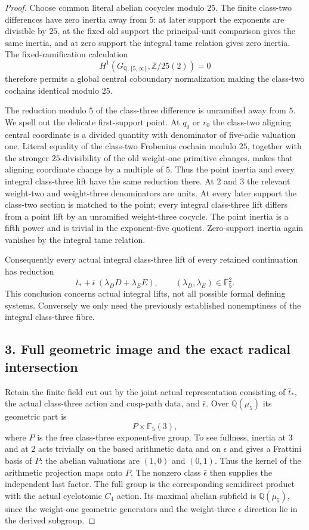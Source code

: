 \documentclass[11pt]{article}
\newcommand{\Z}{\mathbb Z}\newcommand{\F}{\mathbb F}\newcommand{\Q}{\mathbb Q}
\begin{document}
\begin{proof}
Choose common literal abelian cocycles modulo $25$. The finite class-two differences have zero inertia away from $5$: at later support the exponents are divisible by $25$, at the fixed old support the principal-unit comparison gives the same inertia, and at zero support the integral tame relation gives zero inertia. The fixed-ramification calculation
\[
 H^1(G_{\Q,\{5,\infty\}},\Z/25(2))=0
\]
therefore permits a global central coboundary normalization making the class-two cochains identical modulo $25$.

The reduction modulo $5$ of the class-three difference is unramified away from $5$. We spell out the delicate first-support point. At $q_0$ or $r_0$ the class-two aligning central coordinate is a divided quantity with denominator of five-adic valuation one. Literal equality of the class-two Frobenius cochain modulo $25$, together with the stronger $25$-divisibility of the old weight-one primitive changes, makes that aligning coordinate change by a multiple of $5$. Thus the point inertia and every integral class-three lift have the same reduction there. At $2$ and $3$ the relevant weight-two and weight-three denominators are units. At every later support the class-two section is matched to the point; every integral class-three lift differs from a point lift by an unramified weight-three cocycle. The point inertia is a fifth power and is trivial in the exponent-five quotient. Zero-support inertia again vanishes by the integral tame relation.

Consequently every actual integral class-three lift of every retained continuation has reduction
\[
 \bar t_*+\bar\epsilon\,(\lambda_DD+\lambda_EE),
 \qquad (\lambda_D,\lambda_E)\in\F_5^2.
 \tag{2}
\]
This conclusion concerns actual integral lifts, not all possible formal defining systems. Conversely we only need the previously established nonemptiness of the integral class-three fibre.

\subsection*{3. Full geometric image and the exact radical intersection}
Retain the finite field cut out by the joint actual representation consisting of $\bar t_*$, the actual class-three action and cusp-path data, and $\bar\epsilon$. Over $\Q(\mu_5)$ its geometric part is
\[
 P\times\F_5(3),
\]
where $P$ is the free class-three exponent-five group. To see fullness, inertia at $3$ and at $2$ acts trivially on the based arithmetic data and on $\epsilon$ and gives a Frattini basis of $P$: the abelian valuations are $(1,0)$ and $(0,1)$. Thus the kernel of the arithmetic projection maps onto $P$. The nonzero class $\bar\epsilon$ then supplies the independent last factor. The full group is the corresponding semidirect product with the actual cyclotomic $C_4$ action. Its maximal abelian subfield is $\Q(\mu_5)$, since the weight-one geometric generators and the weight-three $\epsilon$ direction lie in the derived subgroup.


\end{proof}
\end{document}
